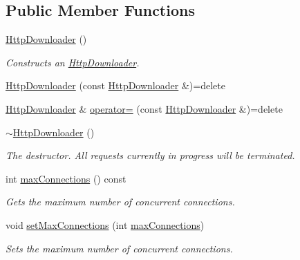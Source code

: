\subsection*{Public Member Functions}
\begin{DoxyCompactItemize}
\item 
\hyperlink{classdg_1_1deepcore_1_1network_1_1_http_downloader_ae33cdc6aaa03ab7bfd69962d9eb1f8a4}{Http\+Downloader} ()
\begin{DoxyCompactList}\small\item\em Constructs an \hyperlink{classdg_1_1deepcore_1_1network_1_1_http_downloader}{Http\+Downloader}. \end{DoxyCompactList}\item 
\hyperlink{classdg_1_1deepcore_1_1network_1_1_http_downloader_aa10b2c7f773278925e8a33c440cf022d}{Http\+Downloader} (const \hyperlink{classdg_1_1deepcore_1_1network_1_1_http_downloader}{Http\+Downloader} \&)=delete
\item 
\hyperlink{classdg_1_1deepcore_1_1network_1_1_http_downloader}{Http\+Downloader} \& \hyperlink{classdg_1_1deepcore_1_1network_1_1_http_downloader_ab9279e9788d902e7120c00e653f25a0e}{operator=} (const \hyperlink{classdg_1_1deepcore_1_1network_1_1_http_downloader}{Http\+Downloader} \&)=delete
\item 
\hyperlink{classdg_1_1deepcore_1_1network_1_1_http_downloader_a82403694b12effcbfd2a06c6bc3ebb2d}{$\sim$\+Http\+Downloader} ()
\begin{DoxyCompactList}\small\item\em The destructor. All requests currently in progress will be terminated. \end{DoxyCompactList}\item 
int \hyperlink{classdg_1_1deepcore_1_1network_1_1_http_downloader_ac61d8926dce16d0041bb8ffddb1b2e2a}{max\+Connections} () const 
\begin{DoxyCompactList}\small\item\em Gets the maximum number of concurrent connections. \end{DoxyCompactList}\item 
void \hyperlink{classdg_1_1deepcore_1_1network_1_1_http_downloader_ac8c49bac88986c9a6a64111ca2146b98}{set\+Max\+Connections} (int \hyperlink{classdg_1_1deepcore_1_1network_1_1_http_downloader_ac61d8926dce16d0041bb8ffddb1b2e2a}{max\+Connections})
\begin{DoxyCompactList}\small\item\em Sets the maximum number of concurrent connections. \end{DoxyCompactList}\item 

\end{DoxyCompactItemize}

